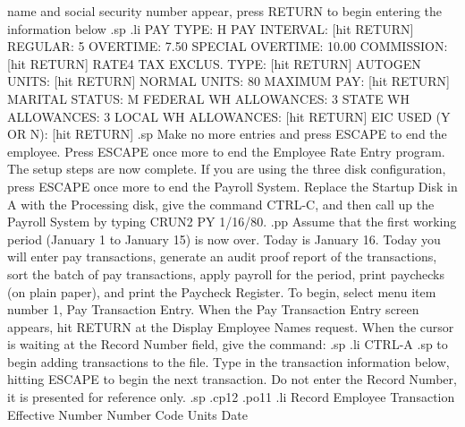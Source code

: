 name and social security number appear, press RETURN to begin entering
the information below
.sp
.li
   PAY TYPE:		   H
   PAY INTERVAL:	   [hit RETURN]
   REGULAR:		   5
   OVERTIME:		   7.50
   SPECIAL OVERTIME:	   10.00
   COMMISSION:		   [hit RETURN]
   RATE4 TAX EXCLUS. TYPE: [hit RETURN]
   AUTOGEN UNITS:	   [hit RETURN]
   NORMAL UNITS:	   80
   MAXIMUM PAY: 	   [hit RETURN]
   MARITAL STATUS:	   M
   FEDERAL WH ALLOWANCES:  3
   STATE   WH ALLOWANCES:  3
   LOCAL   WH ALLOWANCES:  [hit RETURN]
   EIC USED (Y OR N):	   [hit RETURN]
.sp
Make no more entries and press ESCAPE to end the employee.  Press
ESCAPE once more to end the Employee Rate Entry program.  The setup steps
are now complete. If you are using the three disk configuration, press ESCAPE
once more to end the Payroll System.  Replace the Startup Disk in A with the
Processing disk, give the command CTRL-C, and then call up the Payroll System
by typing CRUN2 PY 1/16/80.
.pp
Assume that the first working period (January 1 to January 15) is now
over.  Today is January 16. Today you will enter pay transactions, generate
an audit proof report of the transactions, sort the batch of pay
transactions, apply payroll for the period, print paychecks (on plain paper),
and print the Paycheck Register.  To begin, select menu item number 1,
Pay Transaction Entry.
When the Pay Transaction Entry screen appears, hit RETURN at the Display
Employee Names request.  When
the cursor is waiting at the Record Number field, give the command:
.sp
.li
		CTRL-A
.sp
to begin adding transactions to the file.  Type in the transaction information
below, hitting ESCAPE to begin the next transaction. Do not enter the Record
Number, it is presented for reference only.
.sp
.cp12
.po11
.li
Record	Employee   Transaction		  Effective
Number	 Number       Code	 Units	    Date


